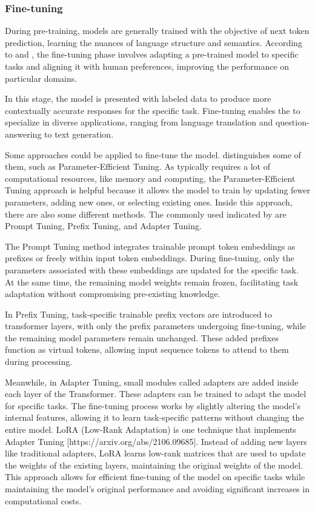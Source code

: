 \subsubsection{Fine-tuning}

During pre-training, models are generally trained with the objective of next token prediction, learning the nuances of language structure and semantics. According to \citet{kamnis_generative_2023} and \citet{hadi_LLM_2023}, the fine-tuning phase involves adapting a pre-trained model to specific tasks and aligning it with human preferences, improving the performance on particular domains.

In this stage, the model is presented with labeled data to produce more contextually accurate responses for the specific task. Fine-tuning enables the {\llm} to specialize in diverse applications, ranging from language translation and question-answering to text generation. 

Some approaches could be applied to fine-tune the model. \citet{naveed_comprehensive_2023} distinguishes some of them, such as Parameter-Efficient Tuning. As {\llm} typically requires a lot of computational resources, like memory and computing, the Parameter-Efficient Tuning approach is helpful because it allows the model to train by updating fewer parameters, adding new ones, or selecting existing ones. Inside this approach, there are also some different methods. The commonly used indicated by \citet{naveed_comprehensive_2023} are Prompt Tuning, Prefix Tuning, and Adapter Tuning.

The Prompt Tuning method integrates trainable prompt token embeddings as prefixes or freely within input token embeddings. During fine-tuning, only the parameters associated with these embeddings are updated for the specific task. At the same time, the remaining model weights remain frozen, facilitating task adaptation without compromising pre-existing knowledge.

In Prefix Tuning, task-specific trainable prefix vectors are introduced to transformer layers, with only the prefix parameters undergoing fine-tuning, while the remaining model parameters remain unchanged. These added prefixes function as virtual tokens, allowing input sequence tokens to attend to them during processing.

Meanwhile, in Adapter Tuning, small modules called adapters are added inside each layer of the Transformer. These adapters can be trained to adapt the model for specific tasks. The fine-tuning process works by slightly altering the model's internal features, allowing it to learn task-specific patterns without changing the entire model. LoRA (Low-Rank Adaptation) is one technique that implements Adapter Tuning [https://arxiv.org/abs/2106.09685]. Instead of adding new layers like traditional adapters, LoRA learns low-rank matrices that are used to update the weights of the existing layers, maintaining the original weights of the model. This approach allows for efficient fine-tuning of the model on specific tasks while maintaining the model's original performance and avoiding significant increases in computational costs.



